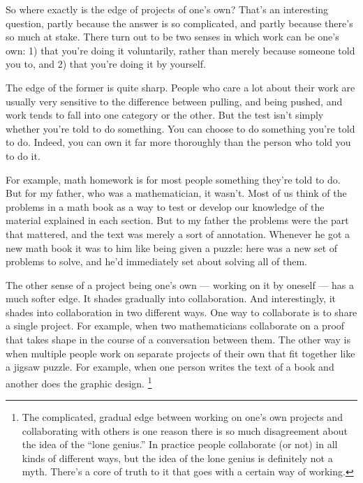 So where exactly is the edge of projects of one's own? That's an
interesting question, partly because the answer is so complicated, and
partly because there's so much at stake. There turn out to be two senses
in which work can be one's own: 1) that you're doing it voluntarily,
rather than merely because someone told you to, and 2) that you're doing
it by yourself.

The edge of the former is quite sharp. People who care a lot about their
work are usually very sensitive to the difference between pulling, and
being pushed, and work tends to fall into one category or the other. But
the test isn't simply whether you're told to do something. You can
choose to do something you're told to do. Indeed, you can own it far
more thoroughly than the person who told you to do it.

For example, math homework is for most people something they're told to
do. But for my father, who was a mathematician, it wasn't. Most of us
think of the problems in a math book as a way to test or develop our
knowledge of the material explained in each section. But to my father
the problems were the part that mattered, and the text was merely a sort
of annotation. Whenever he got a new math book it was to him like being
given a puzzle: here was a new set of problems to solve, and he'd
immediately set about solving all of them.

The other sense of a project being one's own --- working on it by
oneself --- has a much softer edge. It shades gradually into
collaboration. And interestingly, it shades into collaboration in two
different ways. One way to collaborate is to share a single project. For
example, when two mathematicians collaborate on a proof that takes shape
in the course of a conversation between them. The other way is when
multiple people work on separate projects of their own that fit together
like a jigsaw puzzle. For example, when one person writes the text of a
book and another does the graphic design. \footnote{The complicated, gradual edge between working on one's own
projects and collaborating with others is one reason there is so much
disagreement about the idea of the ``lone genius.'' In practice people
collaborate (or not) in all kinds of different ways, but the idea of the
lone genius is definitely not a myth. There's a core of truth to it that
goes with a certain way of working.}

